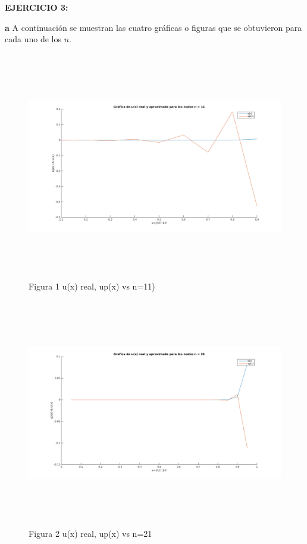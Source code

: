 \documentclass[paper=a4, parskip=full, fontsize=12pt]{scrartcl} %
\numberwithin{equation}{section} %
\numberwithin{figure}{section} %
\numberwithin{table}{section} %
\begin{document}
\textbf{EJERCICIO 3:}

\textbf{a} A continuaci\'on se muestran las cuatro gr\'aficas o figuras que se obtuvieron para cada uno de los $n$.\\

\begin{figure}[hbtp]
\centering
\includegraphics[width=15cm,height=10cm]{n_11.png}
\caption{Figura 1  u(x) real, up(x) vs n=11) }
\end{figure}

\begin{figure}[hbtp]
\centering
\includegraphics[width=15cm,height=10cm]{n_21.png}
\caption{Figura 2  u(x) real, up(x) vs n=21}
\end{figure}
\end{document}
